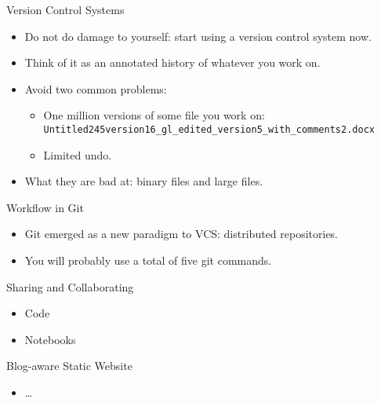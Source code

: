 \documentclass[compress,red]{beamer}\usetheme{Warsaw}\useoutertheme[subsection=false]{smoothbars}
\begin{document}
\begin{frame}[fragile]{Version Control Systems}
\begin{itemize}
\item Do not do damage to yourself: start using a version control system now.

\item Think of it as an annotated history of whatever you work on.

\item Avoid two common problems:
 \begin{itemize}
\item One million versions of some file you work on: {\scriptsize \verb+Untitled245version16_gl_edited_version5_with_comments2.docx+}

\item Limited undo.
\end{itemize}
\item What they are bad at: binary files and large files.
\end{itemize}
\end{frame}

\begin{frame}{Workflow in Git}
\begin{itemize}
\item Git emerged as a new paradigm to VCS: distributed repositories.
 
\item You will probably use a total of five git commands.
\end{itemize}
\end{frame}

\begin{frame}{Sharing and Collaborating}
\begin{itemize}
\item Code
\item Notebooks
\end{itemize}
\end{frame}

\begin{frame}{Blog-aware Static Website}
\begin{itemize}
\item \ldots
\end{itemize}
\end{frame}
\end{document}
